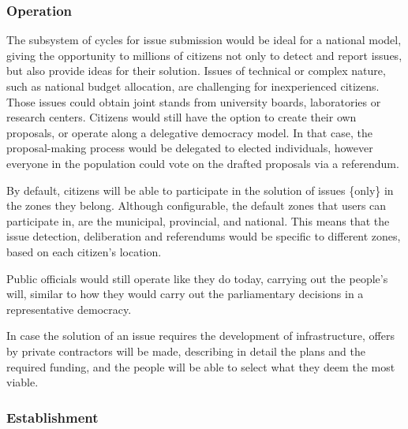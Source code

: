 \documentclass[a4paper,11pt]{article}
\begin{document}
\begin{multicols}{2}

\subsubsection{Operation} \label{operationnational}

The subsystem of cycles for issue submission would be ideal for a national model, giving the opportunity to millions of citizens not only to detect and report issues, but also provide ideas for their solution. Issues of technical or complex nature, such as national budget allocation, are challenging for inexperienced citizens. Those issues could obtain joint stands from university boards, laboratories or research centers. Citizens would still have the option to create their own proposals, or operate along a delegative democracy model. In that case, the proposal-making process would be delegated to elected individuals, however everyone in the population could vote on the drafted proposals via a referendum.

By default, citizens will be able to participate in the solution of issues \{only\} in the zones they belong. Although configurable, the default zones that users can participate in, are the municipal, provincial, and national. This means that the issue detection, deliberation and referendums would be specific to different zones, based on each citizen's location.

Public officials would still operate like they do today, carrying out the people's will, similar to how they would carry out the parliamentary decisions in a representative democracy.

In case the solution of an issue requires the development of infrastructure, offers by private contractors will be made, describing in detail the plans and the required funding, and the people will be able to select what they deem the most viable.

\subsubsection{Establishment} \label{establishmentnational}


\end{multicols}
\end{document}
